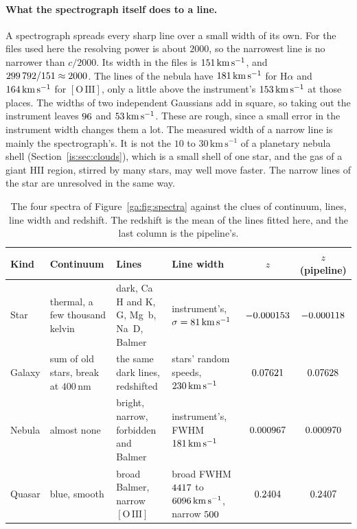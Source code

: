 \paragraph{What the spectrograph itself does to a line.} A spectrograph spreads every sharp line over a small width of its own. For the files used here the resolving power is about $2000$, so the narrowest line is no narrower than $c/2000$. Its width in the files is $151\,\mathrm{km\,s^{-1}}$, and $299\,792/151\approx2000$. The lines of the nebula have $181\,\mathrm{km\,s^{-1}}$ for $\mathrm H\alpha$ and $164\,\mathrm{km\,s^{-1}}$ for $\mathrm{[O\,III]}$, only a little above the instrument's $153\,\mathrm{km\,s^{-1}}$ at those places. The widths of two independent Gaussians add in square, so taking out the instrument leaves $96$ and $53\,\mathrm{km\,s^{-1}}$. These are rough, since a small error in the instrument width changes them a lot. The measured width of a narrow line is mainly the spectrograph's. It is not the $10$ to $30\,\mathrm{km\,s^{-1}}$ of a planetary nebula shell (Section~\ref{is:sec:clouds}), which is a small shell of one star, and the gas of a giant HII region, stirred by many stars, may well move faster. The narrow lines of the star are unresolved in the same way.

\begin{table}[htbp]
	\centering
	\footnotesize
	\setlength{\tabcolsep}{3pt}
	\begin{tabular}{@{}l p{2.7cm} p{2.9cm} p{2.9cm} c c@{}}
		\toprule
		\textbf{Kind} & \textbf{Continuum} & \textbf{Lines} & \textbf{Line width} & $z$ & $z$ (pipeline) \\
		\midrule
		Star & thermal, a few thousand kelvin & dark, Ca H and K, G, Mg~b, Na~D, Balmer & instrument's, $\sigma=81\,\mathrm{km\,s^{-1}}$ & $-0.000153$ & $-0.000118$ \\
		Galaxy & sum of old stars, break at $400\,\mathrm{nm}$ & the same dark lines, redshifted & stars' random speeds, $230\,\mathrm{km\,s^{-1}}$ & $0.07621$ & $0.07628$ \\
		Nebula & almost none & bright, narrow, forbidden and Balmer & instrument's, FWHM $181\,\mathrm{km\,s^{-1}}$ & $0.000967$ & $0.000970$ \\
		Quasar & blue, smooth & broad Balmer, narrow $\mathrm{[O\,III]}$ & broad FWHM $4417$ to $6096\,\mathrm{km\,s^{-1}}$, narrow $500$ & $0.2404$ & $0.2407$ \\
		\bottomrule
	\end{tabular}
	\caption{The four spectra of Figure~\ref{ga:fig:spectra} against the clues of continuum, lines, line width and redshift. The redshift is the mean of the lines fitted here, and the last column is the pipeline's.}
	\label{ga:tab:spectra}
\end{table}

